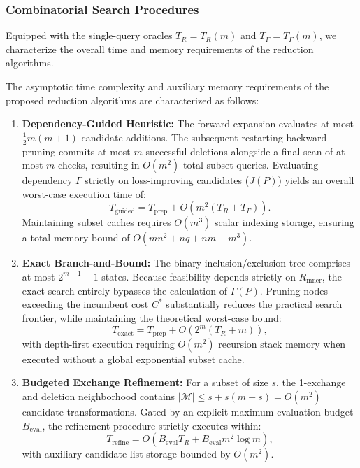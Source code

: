 \subsubsection{Combinatorial Search Procedures}
Equipped with the single-query oracles $T_R = T_R(m)$ and $T_\Gamma = T_\Gamma(m)$, we characterize the overall time and memory requirements of the reduction algorithms.

\begin{proposition}
	\label{prop:complexity-bounds}
	The asymptotic time complexity and auxiliary memory requirements of the proposed reduction algorithms are characterized as follows:
\begin{enumerate}[label=(\roman*)]
		\item \textbf{Dependency-Guided Heuristic:} 
		The forward expansion evaluates at most $\frac{1}{2}m(m+1)$ candidate additions. The subsequent restarting backward pruning commits at most $m$ successful deletions alongside a final scan of at most $m$ checks, resulting in $O(m^2)$ total subset queries. Evaluating dependency $\Gamma$ strictly on loss-improving candidates ($J(P)$) yields an overall worst-case execution time of:
		\begin{equation}
			T_{\mathrm{guided}} = T_{\mathrm{prep}} + O\left(m^2 (T_R + T_\Gamma)\right).
			\label{eq:guided-complexity}
		\end{equation}
		Maintaining subset caches requires $O(m^3)$ scalar indexing storage, ensuring a total memory bound of $O(m n^2 + n q + n m + m^3)$.
		
		\item \textbf{Exact Branch-and-Bound:} 
		The binary inclusion/exclusion tree comprises at most $2^{m+1}-1$ states. Because feasibility depends strictly on $R_{\mathrm{inner}}$, the exact search entirely bypasses the calculation of $\Gamma(P)$. Pruning nodes exceeding the incumbent cost $C^*$ substantially reduces the practical search frontier, while maintaining the theoretical worst-case bound:
		\begin{equation}
			T_{\mathrm{exact}} = T_{\mathrm{prep}} + O\left(2^m (T_R + m)\right),
			\label{eq:exact-complexity}
		\end{equation}
		with depth-first execution requiring $O(m^2)$ recursion stack memory when executed without a global exponential subset cache.
		
		\item \textbf{Budgeted Exchange Refinement:} 
		For a subset of size $s$, the 1-exchange and deletion neighborhood contains $|\mathcal{M}| \le s + s(m - s) = O(m^2)$ candidate transformations. Gated by an explicit maximum evaluation budget $B_{\mathrm{eval}}$, the refinement procedure strictly executes within:
		\begin{equation}
			T_{\mathrm{refine}} = O\left(B_{\mathrm{eval}} T_R + B_{\mathrm{eval}} m^2 \log m\right),
			\label{eq:refine-complexity}
		\end{equation}
		with auxiliary candidate list storage bounded by $O(m^2)$.
	\end{enumerate}
\end{proposition}

